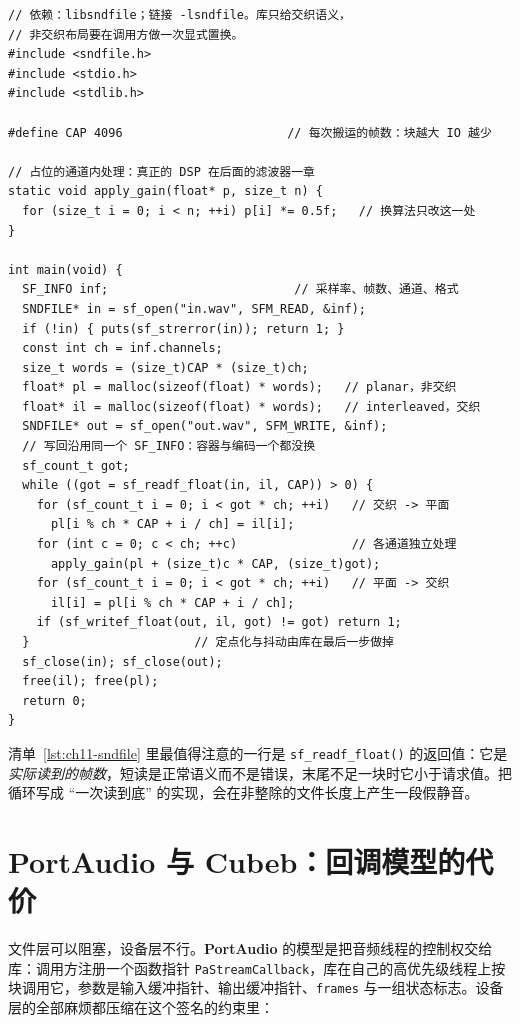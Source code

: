 \documentclass[12pt,a4paper,fontset=fandol]{ctexbook}
\newcommand{\Fn}[1]{\texttt{#1()}}
\newcommand{\Tp}[1]{\texttt{#1}}
\newcommand{\Bk}{\allowbreak}
\newcommand{\Lib}[1]{\textbf{#1}}
\begin{document}
\begin{lstlisting}[style=cstyle,label={lst:ch11-sndfile},caption={libsndfile：读 WAV 转非交织 float32，处理后写回同格式}]
// 依赖：libsndfile；链接 -lsndfile。库只给交织语义，
// 非交织布局要在调用方做一次显式置换。
#include <sndfile.h>
#include <stdio.h>
#include <stdlib.h>

#define CAP 4096                       // 每次搬运的帧数：块越大 IO 越少

// 占位的通道内处理：真正的 DSP 在后面的滤波器一章
static void apply_gain(float* p, size_t n) {
  for (size_t i = 0; i < n; ++i) p[i] *= 0.5f;   // 换算法只改这一处
}

int main(void) {
  SF_INFO inf;                          // 采样率、帧数、通道、格式
  SNDFILE* in = sf_open("in.wav", SFM_READ, &inf);
  if (!in) { puts(sf_strerror(in)); return 1; }
  const int ch = inf.channels;
  size_t words = (size_t)CAP * (size_t)ch;
  float* pl = malloc(sizeof(float) * words);   // planar，非交织
  float* il = malloc(sizeof(float) * words);   // interleaved，交织
  SNDFILE* out = sf_open("out.wav", SFM_WRITE, &inf);
  // 写回沿用同一个 SF_INFO：容器与编码一个都没换
  sf_count_t got;
  while ((got = sf_readf_float(in, il, CAP)) > 0) {
    for (sf_count_t i = 0; i < got * ch; ++i)   // 交织 -> 平面
      pl[i % ch * CAP + i / ch] = il[i];
    for (int c = 0; c < ch; ++c)                // 各通道独立处理
      apply_gain(pl + (size_t)c * CAP, (size_t)got);
    for (sf_count_t i = 0; i < got * ch; ++i)   // 平面 -> 交织
      il[i] = pl[i % ch * CAP + i / ch];
    if (sf_writef_float(out, il, got) != got) return 1;
  }                       // 定点化与抖动由库在最后一步做掉
  sf_close(in); sf_close(out);
  free(il); free(pl);
  return 0;
}
\end{lstlisting}

清单~\ref{lst:ch11-sndfile} 里最值得注意的一行是 \Fn{sf\_readf\_float} 的返回值：它是\emph{实际读到的帧数}，短读是正常语义而不是错误，末尾不足一块时它小于请求值。把循环写成 ``一次读到底'' 的实现，会在非整除的文件长度上产生一段假静音。

\section{\Lib{PortAudio} 与 \Lib{Cubeb}：回调模型的代价}

文件层可以阻塞，设备层不行。\Lib{PortAudio} 的模型是把音频线程的控制权交给库：调用方注册一个函数指针 \Tp{Pa\Bk Stream\Bk Callback}，库在自己的高优先级线程上按块调用它，参数是输入缓冲指针、输出缓冲指针、\Tp{frames} 与一组状态标志。设备层的全部麻烦都压缩在这个签名的约束里：
\end{document}
